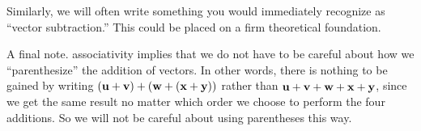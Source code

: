 \documentclass{ximera}
\begin{document}
Similarly, we will often write something you would immediately
recognize as ``vector subtraction.''  This could be placed on a firm
theoretical foundation.

A final note.  associativity implies that we do not have to be careful
about how we ``parenthesize'' the addition of vectors.  In other
words, there is nothing to be gained by writing
$\left(\mathbf{u}+\mathbf{v}\right)+\left(\mathbf{w}+\left(\mathbf{x}+\mathbf{y}\right)\right)$
rather than $\mathbf{u}+\mathbf{v}+\mathbf{w}+\mathbf{x}+\mathbf{y}$, since we
get the same result no matter which order we choose to perform the
four additions.  So we will not be careful about using parentheses
this way.
\end{document}
